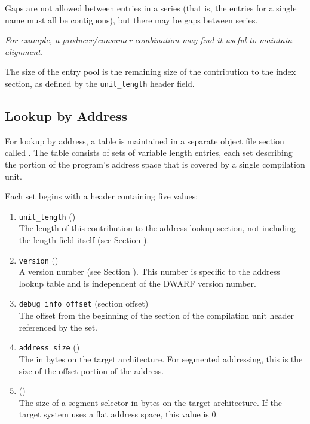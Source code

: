 Gaps are not allowed between entries in a series (that is, the entries
for a single name must all be contiguous), but there may be gaps
between series.

\textit{For example, a producer/consumer combination may find
it useful to maintain alignment.}

The size of the entry pool is the remaining size of the contribution to
the index section, as defined by the \texttt{unit\_length} header field.

\subsection{Lookup by Address}
\label{chap:lookupbyaddress}
For 
lookup by address, a table is maintained in a separate
object file section called 
\dotdebugaranges{}. The table consists
of sets of variable length entries, each set describing the
portion of the program\textquoteright{}s address space that is covered by
a single compilation unit.

Each set begins with a header containing five values:
\begin{enumerate}[1. ]
\item \texttt{unit\_length} () \\
The length of this contribution to the address lookup section,
not including the length field itself 
\bb
(see Section ).
\eb

\item \texttt{version} (\HFTuhalf) \\
A version number
(see Section ). 
This number is specific to the address lookup table and is
independent of the DWARF version number.

\item \texttt{debug\_info\_offset} (section offset) \\
The offset from the
beginning of the \dotdebuginfo{} section of the
compilation unit header referenced by the set.

\item \texttt{address\_size} (\HFTubyte) \\
The 
in bytes on
the target architecture. For 
segmented addressing, this is
the size of the offset portion of the address.

\item \HFNsegmentselectorsize{} (\HFTubyte) \\
The size of a segment selector in
bytes on the target architecture. If the target system uses
a flat address space, this value is 0.

\end{enumerate}


